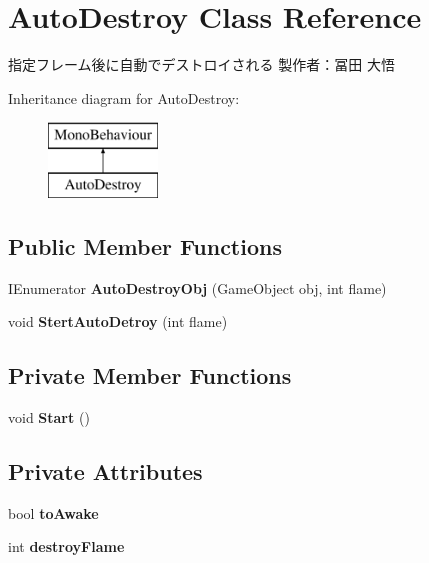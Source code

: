 \hypertarget{class_auto_destroy}{}\section{Auto\+Destroy Class Reference}
\label{class_auto_destroy}


指定フレーム後に自動でデストロイされる 製作者：冨田 大悟  


Inheritance diagram for Auto\+Destroy\+:\begin{figure}[H]
\begin{center}
\leavevmode
\includegraphics[height=2.000000cm]{class_auto_destroy}
\end{center}
\end{figure}
\subsection*{Public Member Functions}
\begin{DoxyCompactItemize}
\item 
\mbox{\label{class_auto_destroy_a34ece12523181e6070736c219d95c799}} 
I\+Enumerator {\bfseries Auto\+Destroy\+Obj} (Game\+Object obj, int flame)
\item 
\mbox{\label{class_auto_destroy_a15be3bd5d0f68424eaba838641184f57}} 
void {\bfseries Stert\+Auto\+Detroy} (int flame)
\end{DoxyCompactItemize}
\subsection*{Private Member Functions}
\begin{DoxyCompactItemize}
\item 
\mbox{\label{class_auto_destroy_a06823e7217554d58bd7f785c60ba6e30}} 
void {\bfseries Start} ()
\end{DoxyCompactItemize}
\subsection*{Private Attributes}
\begin{DoxyCompactItemize}
\item 
\mbox{\label{class_auto_destroy_af3d997b5611e7e4bbd2edaf1f16ddc27}} 
bool {\bfseries to\+Awake}
\item 
\mbox{\label{class_auto_destroy_ac5a9a9e082a50cedf1a31fbd4da77cce}} 
int {\bfseries destroy\+Flame}
\end{DoxyCompactItemize}


